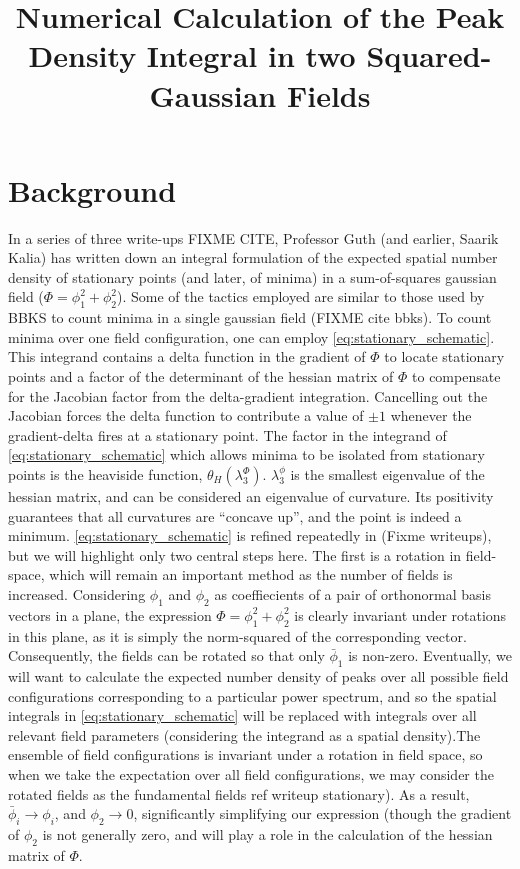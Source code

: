 \documentclass[10pt,letterpaper]{article}
\title{Numerical Calculation of the Peak Density Integral in two Squared-Gaussian Fields}
\begin{document}
\maketitle

\section{Background}

In a series of three write-ups FIXME CITE, Professor Guth (and earlier, Saarik Kalia) has written down an integral formulation of the expected spatial number density of stationary points (and later, of minima) in a sum-of-squares gaussian field ($\Phi = \phi_1^2 + \phi_2^2$). Some of the tactics employed are similar to those used by BBKS to count minima in a single gaussian field (FIXME cite bbks). To count minima over one field configuration, one can employ \ref{eq:stationary_schematic}. This  integrand contains a delta function in the gradient of $\Phi$ to locate stationary points and a factor of the determinant of the hessian matrix of $\Phi$ to compensate for the Jacobian factor from the delta-gradient integration. Cancelling out the Jacobian forces the delta function to contribute a value of $\pm 1$ whenever the gradient-delta fires at a stationary point. The factor in the integrand of \ref{eq:stationary_schematic} which allows minima to be isolated from stationary points is the heaviside function, $\theta_H(\lambda_3^\Phi)$. $\lambda_3^{\phi}$ is the smallest eigenvalue of the hessian matrix, and can be considered an eigenvalue of curvature. Its positivity guarantees that all curvatures are ``concave up'', and the point is indeed a minimum. \ref{eq:stationary_schematic} is refined repeatedly in (Fixme writeups), but we will highlight only two central steps here. The first is a rotation in field-space, which will remain an important method as the number of fields is increased. Considering $\phi_1$ and $\phi_2$ as  coeffiecients of a pair of orthonormal basis vectors in a plane, the expression $\Phi = \phi_1^2 + \phi_2^2$ is clearly invariant under rotations in this plane, as it is simply the norm-squared of the corresponding vector. Consequently, the fields can be rotated so that only $\bar{\phi}_1$ is non-zero. Eventually, we will want to calculate the expected number density of peaks over all possible field configurations corresponding to a particular power spectrum, and so the spatial integrals in \ref{eq:stationary_schematic} will be replaced with integrals over all relevant field parameters (considering the integrand as a spatial density).The ensemble of field configurations is invariant under a rotation in field space, so when we take the expectation over all field configurations, we may consider the rotated fields as the fundamental fields ref writeup stationary). As a result, $\bar{\phi}_i \rightarrow \phi_i$, and $\phi_2 \rightarrow 0$, significantly simplifying our expression (though the gradient of $\phi_2$ is not generally zero, and will play a role in the calculation of the hessian matrix of $\Phi$. 
\end{document}
